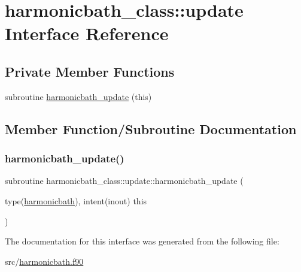 \hypertarget{interfaceharmonicbath__class_1_1update}{}\section{harmonicbath\+\_\+class\+:\+:update Interface Reference}
\label{interfaceharmonicbath__class_1_1update}
\subsection*{Private Member Functions}
\begin{DoxyCompactItemize}
\item 
subroutine \hyperlink{interfaceharmonicbath__class_1_1update_ac439278aaa7e98da3a3976b56b971fd7}{harmonicbath\+\_\+update} (this)
\end{DoxyCompactItemize}


\subsection{Member Function/\+Subroutine Documentation}
\mbox{\label{interfaceharmonicbath__class_1_1update_ac439278aaa7e98da3a3976b56b971fd7}} 
\subsubsection{\texorpdfstring{harmonicbath\+\_\+update()}{harmonicbath\_update()}}
{\footnotesize\ttfamily subroutine harmonicbath\+\_\+class\+::update\+::harmonicbath\+\_\+update (\begin{DoxyParamCaption}\item[{type(\hyperlink{structharmonicbath__class_1_1harmonicbath}{harmonicbath}), intent(inout)}]{this }\end{DoxyParamCaption})\hspace{0.3cm}{\ttfamily [private]}}



The documentation for this interface was generated from the following file\+:\begin{DoxyCompactItemize}
\item 
src/\hyperlink{harmonicbath_8f90}{harmonicbath.\+f90}\end{DoxyCompactItemize}
